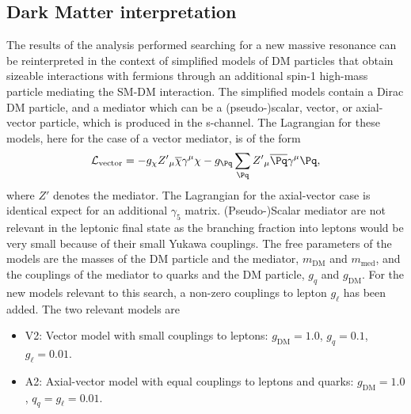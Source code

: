 \subsection{Dark Matter interpretation}
The results of the analysis performed searching for a new massive resonance can be reinterpreted in the context of simplified models of DM particles that obtain sizeable interactions with fermions through an additional spin-1 high-mass particle mediating the SM-DM interaction. The simplified models contain a Dirac DM particle, and a mediator which can be a (pseudo-)scalar, vector, or axial-vector particle, which is produced in the s-channel. The Lagrangian for these models, here for the case of a vector mediator, is of the form
\begin{equation*}
\mathcal{L}_{\text{vector}} =- g_{\chi} {Z'}_{\mu}\overline{\chi}\gamma^{\mu}\chi  - g_{\Pq} \sum_{\Pq} {Z'}_{\mu} \overline{\Pq}\gamma^{\mu}\Pq,
\end{equation*} 
where $Z'$ denotes the mediator. The Lagrangian for the axial-vector case is identical expect for an additional $\gamma_5$ matrix. (Pseudo-)Scalar mediator are not relevant in the leptonic final state as the branching fraction into leptons would be very small because of their small Yukawa couplings.
The free parameters of the models are the masses of the DM particle and the mediator, $m_{\mathrm{DM}}$ and $m_{\mathrm{med}}$, and the couplings of the mediator to quarks and the DM particle, $g_{q}$ and $g_{\mathrm{DM}}$. For the new models relevant to this search, a non-zero couplings to lepton $g_{\ell}$ has been added. The two relevant models are 
\begin{itemize}
\item V2: Vector model with small couplings to leptons: $g_{\mathrm{DM}} = 1.0$, $g_{q} = 0.1$, $g_{\ell} = 0.01$.
\item A2: Axial-vector model with equal couplings to leptons and quarks: $g_{\mathrm{DM}} = 1.0$, $q_q = g_{\ell} = 0.01$. 
\end{itemize}

